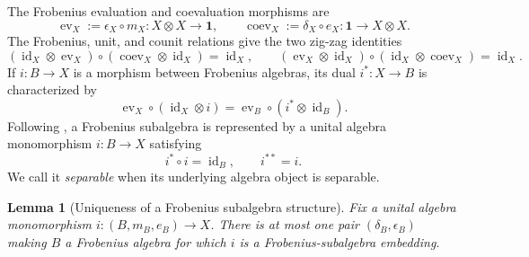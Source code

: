 \documentclass[11pt]{amsart}
\newtheorem{lemma}[theorem]{Lemma}
\theoremstyle{definition}
\theoremstyle{remark}
\newcommand{\one}{\mathbf 1}
\DeclareMathOperator{\id}{id}
\DeclareMathOperator{\ev}{ev}
\DeclareMathOperator{\coev}{coev}
\begin{document}
The Frobenius evaluation and coevaluation morphisms are
\begin{equation}\label{eq:frobenius-pairing-coeval}
  \ev_X:=\epsilon_X\circ m_X:X\otimes X\longrightarrow\one,
  \qquad
  \coev_X:=\delta_X\circ e_X:\one\longrightarrow X\otimes X.
\end{equation}
The Frobenius, unit, and counit relations give the two zig-zag identities
\begin{equation}\label{eq:snake-identities}
  (\id_X\otimes\ev_X)\circ(\coev_X\otimes\id_X)=\id_X,
  \qquad
  (\ev_X\otimes\id_X)\circ(\id_X\otimes\coev_X)=\id_X.
\end{equation}
If $i:B\to X$ is a morphism between Frobenius algebras, its dual
$i^*:X\to B$ is characterized by
\begin{equation}\label{eq:dual-morphism}
  \ev_X\circ(\id_X\otimes i)
  =\ev_B\circ(i^*\otimes\id_B).
\end{equation}
Following \cite{GhoshPalcouxLattices}, a Frobenius subalgebra is
represented by a unital algebra monomorphism $i:B\to X$
satisfying
\begin{equation}\label{eq:gp-conditions}
  i^*\circ i=\id_B,
  \qquad i^{**}=i.
\end{equation}
We call it \emph{separable} when its underlying algebra object is separable.

\begin{lemma}[Uniqueness of a Frobenius subalgebra structure]
\label{lem:frobenius-unique}
Fix a unital algebra monomorphism $i:(B,m_B,e_B)\to X$.
There is at most one pair $(\delta_B,\epsilon_B)$ making $B$ a Frobenius
algebra for which $i$ is a Frobenius-subalgebra embedding.
\end{lemma}
\end{document}

